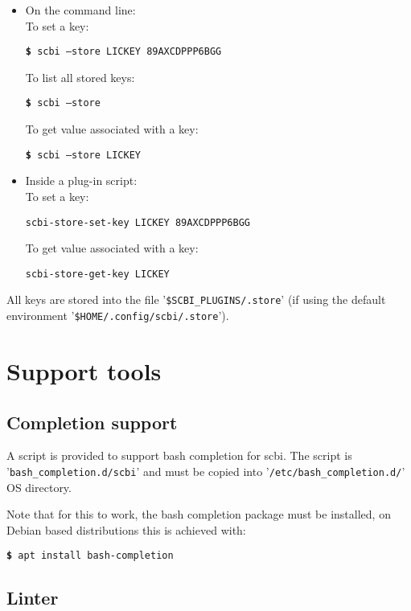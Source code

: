 \documentclass[a4paper,12pt,twoside]{article}
\newcommand{\file}[1]{'{\texttt{#1}}'}
\newcommand{\cmd}[1]{\tabto{1cm}\hspace{0.5cm}\texttt{\textbf{\$} #1}}
\let\stdsection\section
\renewcommand\section{\newpage\stdsection}
\begin{document}
\begin{itemize}
	\item On the command line:\\
	To set a key:

	\cmd{scbi --store LICKEY 89AXCDPPP6BGG}

	To list all stored keys:

	\cmd{scbi --store}

	To get value associated with a key:

	\cmd{scbi --store LICKEY}

	\item Inside a plug-in script:\\
	To set a key:

	\hspace{1.5cm}\texttt{scbi-store-set-key LICKEY 89AXCDPPP6BGG}

	To get value associated with a key:

	\hspace{1.5cm}\texttt{scbi-store-get-key LICKEY}
\end{itemize}

All keys are stored into the file \file{\$SCBI\_PLUGINS/.store} (if using the default environment \file{\$HOME/.config/scbi/.store}).


\section{Support tools}

\subsection{Completion support}
\label{completion}

A script is provided to support bash completion for scbi. The script is \file{bash\_completion.d/scbi} and must be copied into \file{/etc/bash\_completion.d/} OS directory.

Note that for this to work, the bash completion package must be installed, on Debian based distributions this is achieved with:

\cmd{apt install bash-completion}

\subsection{Linter}
\label{linter}
\end{document}
